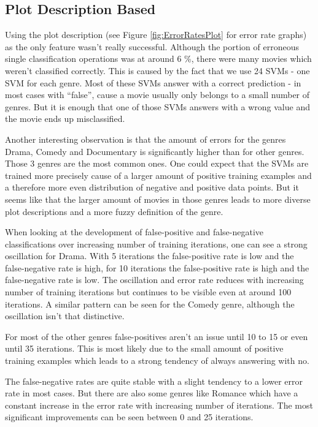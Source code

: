 \documentclass{vldb}
\begin{document}
\subsection{Plot Description Based}
\par Using the plot description (see Figure \ref{fig:ErrorRatesPlot} for error rate graphs) as the only feature wasn't really successful. Although the portion of erroneous single classification operations was at around 6 \%, there were many movies which weren't classified correctly. This is caused by the fact that we use 24 SVMs - one SVM for each genre. Most of these SVMs answer with a correct prediction - in most cases with “false”, cause a movie usually only belongs to a small number of genres. But it is enough that one of those SVMs answers with a wrong value and the movie ends up misclassified.
\par Another interesting observation is that the amount of errors for the genres Drama, Comedy and Documentary is significantly higher than for other genres. Those 3 genres are the most common ones. One could expect that the SVMs are trained more precisely cause of a larger amount of positive training examples and a therefore more even distribution of negative and positive data points. But it seems like that the larger amount of movies in those genres leads to more diverse plot descriptions and a more fuzzy definition of the genre.
\par When looking at the development of false-positive and false-negative classifications over increasing number of training iterations, one can see a strong oscillation for Drama. With 5 iterations the false-positive rate is low and the false-negative rate is high, for 10 iterations the false-positive rate is high and the false-negative rate is low. The oscillation and error rate reduces with increasing number of training iterations but continues to be visible even at around 100 iterations. A similar pattern can be seen for the Comedy genre, although the oscillation isn't that distinctive.
\par For most of the other genres false-positives aren't an issue until 10 to 15 or even until 35 iterations. This is most likely due to the small amount of positive training examples which leads to a strong tendency of always answering with no.
\par The false-negative rates are quite stable with a slight tendency to a lower error rate in most cases. But there are also some genres like Romance which have a constant increase in the error rate with increasing number of iterations. The most significant improvements can be seen between 0 and 25 iterations.
\end{document}
